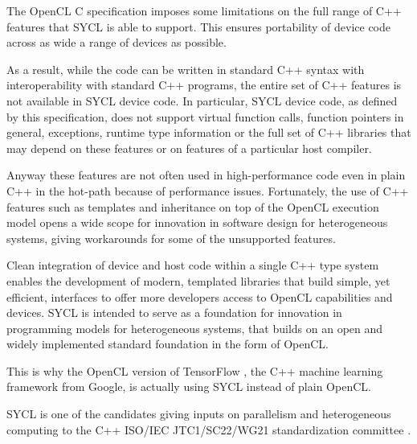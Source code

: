 \documentclass[sigplan, review]{acmart}
\begin{document}
The OpenCL C specification imposes some limitations on the full range
of C++ features that SYCL is able to support. This ensures portability
of device code across as wide a range of devices as possible.

As a result, while the code can be written in standard C++ syntax with
interoperability with standard C++ programs, the entire set of C++
features is not available in SYCL device code. In particular, SYCL
device code, as defined by this specification, does not support
virtual function calls, function pointers in general, exceptions,
runtime type information or the full set of C++ libraries that may
depend on these features or on features of a particular host compiler.

Anyway these features are not often used in high-performance code even
in plain C++ in the hot-path because of performance issues.
Fortunately, the use of C++ features such as templates and inheritance
on top of the OpenCL execution model opens a wide scope for innovation
in software design for heterogeneous systems, giving workarounds for
some of the unsupported features.

Clean integration of device and host code within a single C++ type
system enables the development of modern, templated libraries that
build simple, yet efficient, interfaces to offer more developers
access to OpenCL capabilities and devices. SYCL is intended to serve
as a foundation for innovation in programming models for heterogeneous
systems, that builds on an open and widely implemented standard
foundation in the form of OpenCL.

This is why the OpenCL version of TensorFlow \cite{TensorFlow-1.0},
the C++ machine learning framework from Google, is actually using SYCL
instead of plain OpenCL.

SYCL is one of the candidates giving inputs on parallelism and
heterogeneous computing to the C++ ISO/IEC JTC1/SC22/WG21
standardization committee
\cite{C++:P00236R0:SYCL,C++:P0362R0,C++:P0363R0,C++:P0367R0}.

\end{document}
